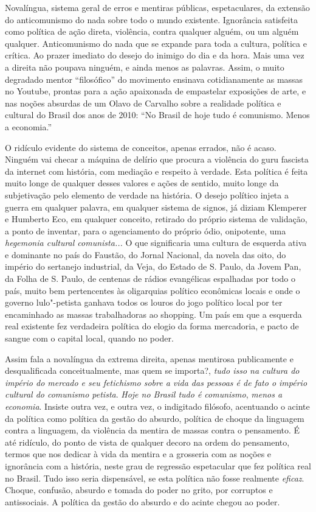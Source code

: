 Novalíngua, sistema geral de erros e mentiras públicas, espetaculares,
da extensão do anticomunismo do nada sobre todo o mundo existente.
Ignorância satisfeita como política de ação direta, violência, contra
qualquer alguém, ou um alguém qualquer. Anticomunismo do nada que se
expande para toda a cultura, política e crítica. Ao prazer imediato do
desejo do inimigo do dia e da hora. Mais uma vez a direita não poupava
ninguém, e ainda menos as palavras. Assim, o muito degradado mentor
``filosófico'' do movimento ensinava cotidianamente as massas no
Youtube, prontas para a ação apaixonada de empastelar exposições de
arte, e nas noções absurdas de um Olavo de Carvalho sobre a realidade
política e cultural do Brasil dos anos de 2010: ``No Brasil de hoje tudo
é comunismo. Menos a economia.''

O ridículo evidente do sistema de conceitos, apenas errados, não é
acaso. Ninguém vai checar a máquina de delírio que procura a violência
do guru fascista da internet com história, com mediação e respeito à
verdade. Esta política é feita muito longe de qualquer desses valores e
ações de sentido, muito longe da subjetivação pelo elemento de verdade
na história. O desejo político injeta a guerra em qualquer palavra, em
qualquer sistema de signos, já diziam Klemperer e Humberto Eco, em
qualquer conceito, retirado do próprio sistema de validação, a ponto de
inventar, para o agenciamento do próprio ódio, onipotente, uma
\emph{hegemonia cultural comunista...} O que significaria uma cultura de
esquerda ativa e dominante no país do Faustão, do Jornal Nacional, da
novela das oito, do império do sertanejo industrial, da Veja, do Estado
de S. Paulo, da Jovem Pan, da Folha de S. Paulo, de centenas de rádios
evangélicas espalhadas por todo o país, muito bem pertencentes às
oligarquias político econômicas locais e onde o governo lulo"-petista
ganhava todos os louros do jogo político local por ter encaminhado as
massas trabalhadoras ao shopping. Um país em que a esquerda real
existente fez verdadeira política do elogio da forma mercadoria, e pacto
de sangue com o capital local, quando no poder.

Assim fala a novalíngua da extrema direita, apenas mentirosa
publicamente e desqualificada conceitualmente, mas quem se importa?,
\emph{tudo isso na cultura do império do mercado e seu fetichismo sobre
a vida das pessoas é de fato o império cultural do comunismo petista}.
\emph{Hoje no Brasil tudo é comunismo}, \emph{menos a economia}. Insiste
outra vez, e outra vez, o indigitado filósofo, acentuando o acinte da
política como política da gestão do absurdo, política de choque da
linguagem contra a linguagem, da violência da mentira de massas contra o
pensamento. É até ridículo, do ponto de vista de qualquer decoro na
ordem do pensamento, termos que nos dedicar à vida da mentira e a
grosseria com as noções e ignorância com a história, neste grau de
regressão espetacular que fez política real no Brasil. Tudo isso seria
dispensável, se esta política não fosse realmente \emph{eficaz}. Choque,
confusão, absurdo e tomada do poder no grito, por corruptos e
antissociais. A política da gestão do absurdo e do acinte chegou ao
poder.

